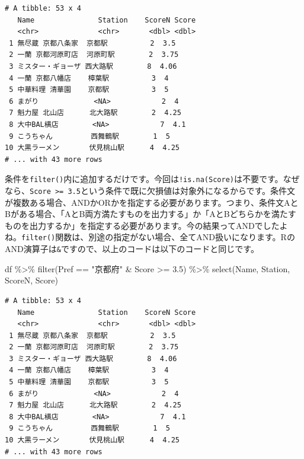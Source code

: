 \documentclass[
  a4paper,
  pandoc,
  ja=standard,
  jafont=haranoaji]{bxjsbook}
\newenvironment{Shaded}{\begin{snugshade}}{\end{snugshade}}
\newcommand{\FloatTok}[1]{\textcolor[rgb]{0.68,0.00,0.00}{#1}}
\newcommand{\FunctionTok}[1]{\textcolor[rgb]{0.28,0.35,0.67}{#1}}
\newcommand{\NormalTok}[1]{\textcolor[rgb]{0.00,0.48,0.65}{#1}}
\newcommand{\SpecialCharTok}[1]{\textcolor[rgb]{0.37,0.37,0.37}{#1}}
\newcommand{\StringTok}[1]{\textcolor[rgb]{0.13,0.47,0.30}{#1}}
\begin{document}
\begin{verbatim}
# A tibble: 53 x 4
   Name               Station    ScoreN Score
   <chr>              <chr>       <dbl> <dbl>
 1 無尽蔵 京都八条家  京都駅          2  3.5 
 2 一蘭 京都河原町店  河原町駅        2  3.75
 3 ミスター・ギョーザ 西大路駅        8  4.06
 4 一蘭 京都八幡店    樟葉駅          3  4   
 5 中華料理 清華園    京都駅          3  5   
 6 まがり             <NA>            2  4   
 7 魁力屋 北山店      北大路駅        2  4.25
 8 大中BAL横店        <NA>            7  4.1 
 9 こうちゃん         西舞鶴駅        1  5   
10 大黒ラーメン       伏見桃山駅      4  4.25
# ... with 43 more rows
\end{verbatim}

条件を\texttt{filter()}内に追加するだけです。今回は\texttt{!is.na(Score)}は不要です。なぜなら、\texttt{Score\ \textgreater{}=\ 3.5}という条件で既に欠損値は対象外になるからです。条件文が複数ある場合、ANDかORかを指定する必要があります。つまり、条件文AとBがある場合、「AとB両方満たすものを出力する」か「AとBどちらかを満たすものを出力するか」を指定する必要があります。今の結果ってANDでしたよね。\texttt{filter()}関数は、別途の指定がない場合、全てAND扱いになります。RのAND演算子は\texttt{\&}ですので、以上のコードは以下のコードと同じです。

\begin{Shaded}
\begin{Highlighting}[numbers=left,,]
\NormalTok{df }\SpecialCharTok{\%\textgreater{}\%}
  \FunctionTok{filter}\NormalTok{(Pref }\SpecialCharTok{==} \StringTok{"京都府"} \SpecialCharTok{\&}\NormalTok{ Score }\SpecialCharTok{\textgreater{}=} \FloatTok{3.5}\NormalTok{) }\SpecialCharTok{\%\textgreater{}\%}
  \FunctionTok{select}\NormalTok{(Name, Station, ScoreN, Score)}
\end{Highlighting}
\end{Shaded}

\begin{verbatim}
# A tibble: 53 x 4
   Name               Station    ScoreN Score
   <chr>              <chr>       <dbl> <dbl>
 1 無尽蔵 京都八条家  京都駅          2  3.5 
 2 一蘭 京都河原町店  河原町駅        2  3.75
 3 ミスター・ギョーザ 西大路駅        8  4.06
 4 一蘭 京都八幡店    樟葉駅          3  4   
 5 中華料理 清華園    京都駅          3  5   
 6 まがり             <NA>            2  4   
 7 魁力屋 北山店      北大路駅        2  4.25
 8 大中BAL横店        <NA>            7  4.1 
 9 こうちゃん         西舞鶴駅        1  5   
10 大黒ラーメン       伏見桃山駅      4  4.25
# ... with 43 more rows
\end{verbatim}
\end{document}
